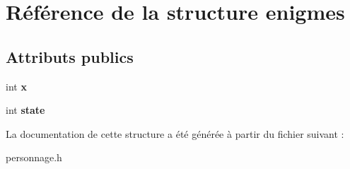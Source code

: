\hypertarget{structenigmes}{}\section{Référence de la structure enigmes}
\label{structenigmes}
\subsection*{Attributs publics}
\begin{DoxyCompactItemize}
\item 
\mbox{\label{structenigmes_a44688626c3a34bc3e0180b020e01685b}} 
int {\bfseries x}
\item 
\mbox{\label{structenigmes_a35651ad92c98da8fa1bfa4e85dd7dca3}} 
int {\bfseries state}
\end{DoxyCompactItemize}


La documentation de cette structure a été générée à partir du fichier suivant \+:\begin{DoxyCompactItemize}
\item 
personnage.\+h\end{DoxyCompactItemize}
